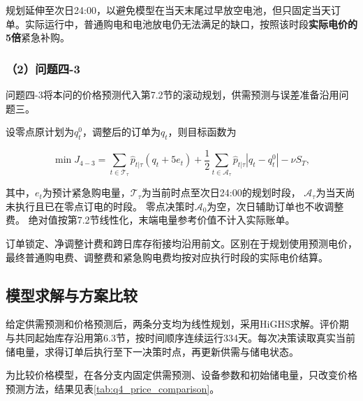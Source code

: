 规划延伸至次日24:00，以避免模型在当天末尾过早放空电池，但只固定当天订单。实际运行中，普通购电和电池放电仍无法满足的缺口，按照该时段\textbf{实际电价的5倍}紧急补购。

\subsubsection*{（2）问题四-3}

问题四-3将本问的价格预测代入第7.2节的滚动规划，供需预测与误差准备沿用问题三。

设零点原计划为$q_t^0$，调整后的订单为$q_t$，则目标函数为

\begin{equation}
\min J_{4-3}
=
\sum_{t\in \mathcal T_{\tau}}
\hat{p}_{t|\tau}
\left(q_t+5e_t\right)
+
\frac{1}{2}
\sum_{t\in \mathcal A_{\tau}}
\hat{p}_{t|\tau}
\left|q_t-q_t^0\right|
-
\nu S_T,
\end{equation}

其中，$e_t$为预计紧急购电量，$\mathcal T_{\tau}$为当前时点至次日24:00的规划时段，
$\mathcal A_{\tau}$为当天尚未执行且已在零点订电的时段。
零点决策时$\mathcal A_0$为空，次日辅助订单也不收调整费。
绝对值按第7.2节线性化，末端电量参考价值不计入实际账单。

订单锁定、净调整计费和跨日库存衔接均沿用前文。区别在于规划使用预测电价，最终普通购电费、调整费和紧急购电费均按对应执行时段的实际电价结算。

\subsection{模型求解与方案比较}

给定供需预测和价格预测后，两条分支均为线性规划，采用HiGHS求解。评价期与共同起始库存沿用第6.3节，按时间顺序连续运行334天。每次决策读取真实当前储电量，求得订单后执行至下一决策时点，再更新供需与储电状态。

为比较价格模型，在各分支内固定供需预测、设备参数和初始储电量，只改变价格预测方法，结果见表\ref{tab:q4_price_comparison}。

